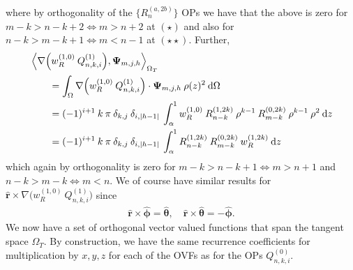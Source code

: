 \documentclass[11pt, oneside]{article}   	%
\newcommand{\genjac}{R}
\newcommand{\genjacnmk}{\genjac_{n-k}}
\newcommand{\genjacw}{w_\genjac}
\newcommand{\scop}{Q}
\newcommand{\scopnki}{\scop_{n,k,i}}
\newcommand{\tangentspace}{{\Omega_T}}
\newcommand{\phivec}{\hat{\bm{\phi}}}
\newcommand{\thetavec}{\hat{\bm{\theta}}}
\newcommand{\tsopii}{\bm{\Psi}}
\newcommand{\rvec}{\hat{\bm{r}}}
\begin{document}
where by orthogonality of the $\{\genjac_n^{(a,2b)}\}$ OPs we have that the above is zero for $m - k > n - k + 2 \iff m > n + 2$ at $(\star)$ and also for $n - k > m - k + 1 \iff m < n - 1$ at $(\star \star)$. Further, 
\begin{align*}
	&\ip<\nabla \Big( \genjacw^{(1,0)} \: \scopnki^{(1)} \Big), \tsopii_{m,j,h}>_\tangentspace \\
	&\quad \quad = \int_\Omega \nabla \Big( \genjacw^{(1,0)} \: \scopnki^{(1)} \Big) \cdot \tsopii_{m,j,h} \: \rho(z)^2 \:\D \Omega \\
	&\quad \quad = (-1)^{i+1} \: k \: \pi \: \delta_{k,j} \: \delta_{i,|h-1|} \: \int_\alpha^1 \genjacw^{(1,0)} \: \genjacnmk^{(1,2k)} \: \rho^{k-1} \: \genjac_{m-k}^{(0,2k)} \: \rho^{k-1} \: \rho^2 \:\D z \\
	&\quad \quad = (-1)^{i+1} \: k \: \pi \: \delta_{k,j} \: \delta_{i,|h-1|} \: \int_\alpha^1 \genjacnmk^{(1,2k)}  \: \genjac_{m-k}^{(0,2k)} \: \genjacw^{(1,2k)} \: \D z
\end{align*}
which again by orthogonality is zero for $m - k > n - k + 1 \iff m > n + 1$ and $n - k > m - k \iff m < n$. We of course have similar results for $\rvec \times \nabla \Big( \genjacw^{(1,0)} \: \scopnki^{(1)} \Big)$ since
\begin{align*}
	\rvec \times \phivec = \thetavec, \quad \rvec \times \thetavec = - \phivec.
\end{align*}
We now have a set of orthogonal vector valued functions that span the tangent space $\tangentspace$. By construction, we have the same recurrence coefficients for multiplication by $x,y,z$ for each of the OVFs as for the OPs $\scopnki^{(0)}$. 
\end{document}
